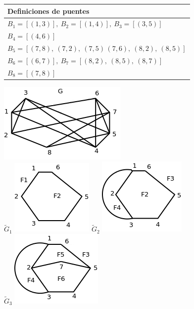 \documentclass[10pt,a5paper]{book}
\begin{document}
\begin{figure}[H]
\begin{tabular}{|c|c|c|c|c|c|c|}
\hline
\end{tabular}
\newline
\newline
\begin{tabular}{|p{8cm}|}
\hline
Definiciones de puentes \\
\hline
$B_1 = [(1,3)],\ B_2 = [(1,4)],\ B_3 = [(3,5)]$ \\
$B_4 = [(4,6)]$ \\
$B_5 = [(7,8),\ (7,2),\ (7,5)\, (7,6),\ (8,2),\ (8,5)]$\\
$B_6 = [(6,7)],\ B_7 = [(8,2),\ (8,5),\ (8,7)]$\\
$B_8 = [(7,8)]$\\
\hline
\end{tabular}
\end{figure}
\begin{figure}[H]
\hspace*{1in}\includegraphics[scale=.35]{Fig3_20_a.png} \\
\hspace*{.5in}$\widetilde{G}_1$ \includegraphics[scale=.3]{Fig3_20_b.png}
$\widetilde{G}_2$ \includegraphics[scale=.3]{Fig3_20_c.png} \\
\hspace*{.5in}$\widetilde{G}_3$ \includegraphics[scale=.3]{Fig3_20_d.png} 

\end{figure}
\end{document}
